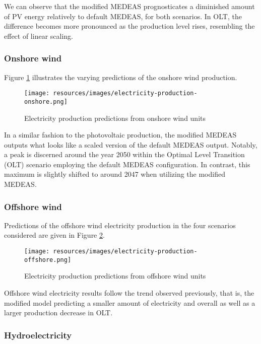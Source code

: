 We can observe that the modified MEDEAS prognosticates a diminished amount of PV energy relatively to default MEDEAS, for both scenarios. In OLT, the difference becomes more pronounced as the production level rises, resembling the effect of linear scaling.

\subsubsection{Onshore wind}

Figure \ref{fig:electricity-production-onshore} illustrates the varying predictions of the onshore wind production.

\begin{figure}[h]
    \centering
    \texttt{[image: resources/images/electricity-production-onshore.png]}
    \caption{Electricity production predictions from onshore wind units}
    \label{fig:electricity-production-onshore}
\end{figure}

In a similar fashion to the photovoltaic production, the modified MEDEAS outputs what looks like a scaled version of the default MEDEAS output. Notably, a peak is discerned around the year 2050 within the Optimal Level Transition (OLT) scenario employing the default MEDEAS configuration. In contrast, this maximum is slightly shifted to around 2047 when utilizing the modified MEDEAS. 

\subsubsection{Offshore wind}

Predictions of the offshore wind electricity production in the four scenarios considered are given in Figure \ref{fig:electricity-production-offshore}.

\begin{figure}[h]
    \centering
    \texttt{[image: resources/images/electricity-production-offshore.png]}
    \caption{Electricity production predictions from offshore wind units}
    \label{fig:electricity-production-offshore}
\end{figure}

Offshore wind electricity results follow the trend observed previously, that is, the modified model predicting a smaller amount of electricity and overall as well as a larger production decrease in OLT.

\subsubsection{Hydroelectricity}

